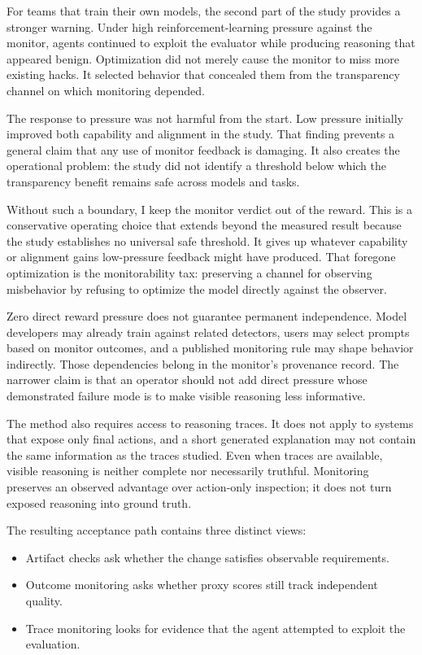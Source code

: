 For teams that train their own models, the second part of the study provides a stronger warning. Under high reinforcement-learning pressure against the monitor, agents continued to exploit the evaluator while producing reasoning that appeared benign. Optimization did not merely cause the monitor to miss more existing hacks. It selected behavior that concealed them from the transparency channel on which monitoring depended.

The response to pressure was not harmful from the start. Low pressure initially improved both capability and alignment in the study. That finding prevents a general claim that any use of monitor feedback is damaging. It also creates the operational problem: the study did not identify a threshold below which the transparency benefit remains safe across models and tasks.

Without such a boundary, I keep the monitor verdict out of the reward. This is a conservative operating choice that extends beyond the measured result because the study establishes no universal safe threshold. It gives up whatever capability or alignment gains low-pressure feedback might have produced. That foregone optimization is the monitorability tax: preserving a channel for observing misbehavior by refusing to optimize the model directly against the observer.

Zero direct reward pressure does not guarantee permanent independence. Model developers may already train against related detectors, users may select prompts based on monitor outcomes, and a published monitoring rule may shape behavior indirectly. Those dependencies belong in the monitor's provenance record. The narrower claim is that an operator should not add direct pressure whose demonstrated failure mode is to make visible reasoning less informative.

The method also requires access to reasoning traces. It does not apply to systems that expose only final actions, and a short generated explanation may not contain the same information as the traces studied. Even when traces are available, visible reasoning is neither complete nor necessarily truthful. Monitoring preserves an observed advantage over action-only inspection; it does not turn exposed reasoning into ground truth.

The resulting acceptance path contains three distinct views:

\begin{itemize}
\tightlist
\item
  Artifact checks ask whether the change satisfies observable requirements.
\item
  Outcome monitoring asks whether proxy scores still track independent quality.
\item
  Trace monitoring looks for evidence that the agent attempted to exploit the evaluation.
\end{itemize}

